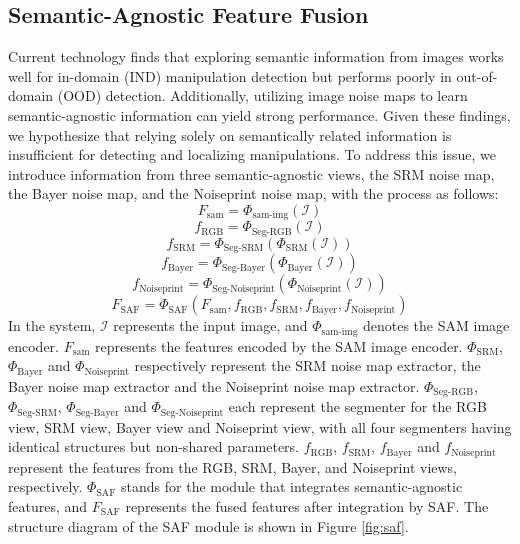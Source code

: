 \subsection{Semantic-Agnostic Feature Fusion}
Current technology finds that exploring semantic information from images works well for in-domain (IND) manipulation detection but performs poorly in out-of-domain (OOD) detection. Additionally, utilizing image noise maps to learn semantic-agnostic information can yield strong performance. Given these findings, we hypothesize that relying solely on semantically related information is insufficient for detecting and localizing manipulations. To address this issue, we introduce information from three semantic-agnostic views, the SRM noise map, the Bayer noise map, and the Noiseprint  noise map, with the process as follows:
\begin{equation}
F_{\text{sam}} = \Phi_{\text{sam-img}}(\mathcal{I})
\end{equation}
\begin{equation}
f_{\text{RGB}} = \Phi_{\text{Seg-RGB}}(\mathcal{I})
\end{equation}
\begin{equation}
f_{\text{SRM}} = \Phi_{\text{Seg-SRM}}\left(\Phi_{\text{SRM}}(\mathcal{I})\right)
\end{equation}
\begin{equation}
f_{\text{Bayer}} = \Phi_{\text{Seg-Bayer}}\left(\Phi_{\text{Bayer}}(\mathcal{I})\right)
\end{equation}
\begin{equation}
f_{\text{Noiseprint}} = \Phi_{\text{Seg-Noiseprint}}\left(\Phi_{\text{Noiseprint}}(\mathcal{I})\right)
\end{equation}
\begin{equation}
F_{\text{SAF}} = \Phi_{\text{SAF}}\left(F_{\text{sam}}, f_{\text{RGB}}, f_{\text{SRM}}, f_{\text{Bayer}},f_{\text{Noiseprint}}\right)
\end{equation}
In the system, $\mathcal{I}$ represents the input image, and $\Phi_{\text{sam-img}}$ denotes the SAM image encoder. $F_{\text{sam}}$ represents the features encoded by the SAM image encoder. $\Phi_{\mathrm{SRM}}$, $\Phi_{\text{Bayer}}$ and $\Phi_{\text{Noiseprint}}$ respectively represent the SRM noise map extractor, the Bayer noise map extractor and the Noiseprint noise map extractor. $\Phi_{\text{Seg-RGB}}$, $\Phi_{\text{Seg-SRM}}$, $\Phi_{\text{Seg-Bayer}}$ and $\Phi_{\text{Seg-Noiseprint}}$ each represent the segmenter for the RGB view, SRM view, Bayer view and Noiseprint view, with all four segmenters having identical structures but non-shared parameters. $f_{\mathrm{RGB}}$, $f_{\mathrm{SRM}}$, $f_{\mathrm{Bayer}}$ and $f_{\mathrm{Noiseprint}}$ represent the features from the RGB, SRM, Bayer, and Noiseprint views, respectively. $\Phi_{\mathrm{SAF}}$ stands for the module that integrates semantic-agnostic features, and $F_{\mathrm{SAF}}$ represents the fused features after integration by SAF. The structure diagram of the SAF module is shown in Figure \ref{fig:saf}.


